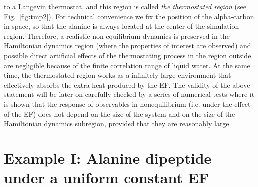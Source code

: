 \documentclass[a4paper,preprint,unsortedaddress,onecolumn]{revtex4-1}
\begin{document}
to a Langevin thermostat, and this region is called \emph{the thermostated
region} (see Fig.~\ref{fig:tmp2}). For technical convenience we
fix the position of the alpha-carbon in space, so that the alanine is always
located at the center of the simulation region.
Therefore, a realistic non equilibrium  dynamics is preserved in the Hamiltonian dynamics region (where the properties of interest are observed)
and possible direct artificial effects of the thermostating process in the region outside are negligible because of the finite correlation
range of liquid water.
At the same time, the thermostated region works as a infinitely large
environment that effectively absorbs the extra heat produced by the EF.
The validity of the above
statement will be later on carefully checked by a series of numerical tests where it is shown that
the response of observables in nonequilibrium (i.e. under the effect of the EF) does not depend on the size of the system
and on the size of the Hamiltonian dynamics subregion, provided that they are
reasonably large.



\section{Example I: Alanine dipeptide
  under a uniform  constant EF}
\end{document}
